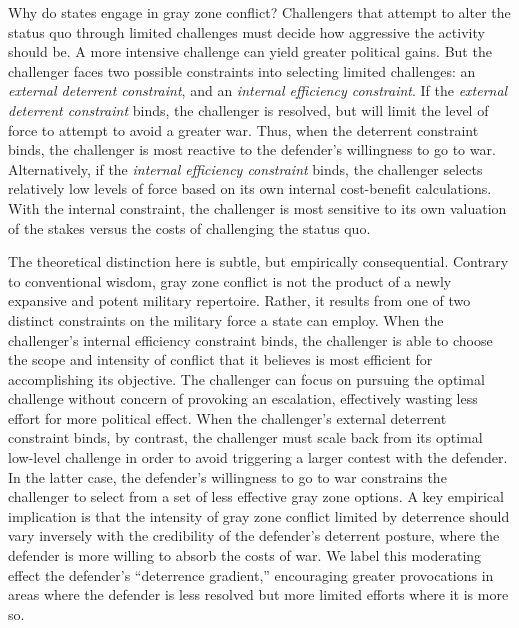 \documentclass[11pt,letterpaper,pdftex,dvipsnames,table]{article}
\begin{document}
Why do states engage in gray zone conflict? Challengers that attempt to alter the status quo through limited challenges must decide how aggressive the activity should be. A more intensive challenge can yield greater political gains. But the challenger faces two possible constraints into selecting limited challenges: an \textit{external deterrent constraint}, and an \textit{internal efficiency constraint}. If the \textit{external deterrent constraint} binds, the challenger is resolved, but will limit the level of force to attempt to avoid a greater war. Thus, when the deterrent constraint binds, the challenger is most reactive to the defender's willingness to go to war. Alternatively, if the \textit{internal efficiency constraint} binds, the challenger selects relatively low levels of force based on its own internal cost-benefit calculations. With the internal constraint, the challenger is most sensitive to its own valuation of the stakes versus the costs of challenging the status quo.

The theoretical distinction here is subtle, but empirically consequential. Contrary to conventional wisdom, gray zone conflict is not the product of a newly expansive and potent military repertoire. Rather, it results from one of two distinct constraints on the military force a state can employ. When the challenger's internal efficiency constraint binds, the challenger is able to choose the scope and intensity of conflict that it believes is most efficient for accomplishing its objective. The challenger can focus on pursuing the optimal challenge without concern of provoking an escalation, effectively wasting less effort for more political effect. When the challenger's external deterrent constraint binds, by contrast, the challenger must scale back from its optimal low-level challenge in order to avoid triggering a larger contest with the defender. In the latter case, the defender's willingness to go to war constrains the challenger to select from a set of less effective gray zone options. A key empirical implication is that the intensity of gray zone conflict limited by deterrence should vary inversely with the credibility of the defender's deterrent posture, where the defender is more willing to absorb the costs of war. We label this moderating effect the defender's ``deterrence gradient,'' encouraging greater provocations in areas where the defender is less resolved but more limited efforts where it is more so. 
\end{document}
